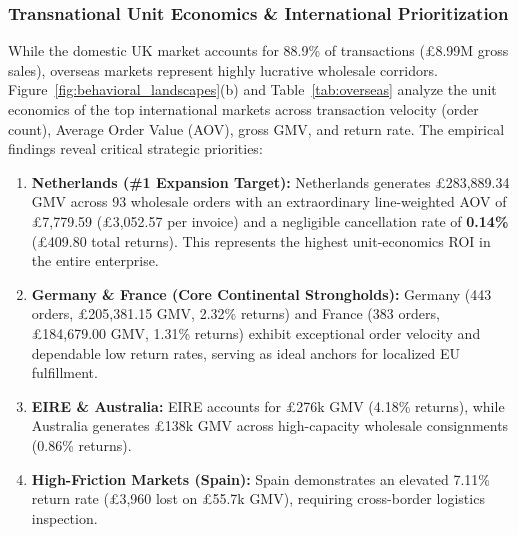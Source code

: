 \documentclass[sigconf,nonacm]{acmart}
\begin{document}
\subsubsection{Transnational Unit Economics \& International Prioritization}
While the domestic UK market accounts for 88.9\% of transactions (£8.99M gross sales), overseas markets represent highly lucrative wholesale corridors. Figure~\ref{fig:behavioral_landscapes}(b) and Table~\ref{tab:overseas} analyze the unit economics of the top international markets across transaction velocity (order count), Average Order Value (AOV), gross GMV, and return rate. The empirical findings reveal critical strategic priorities:
\begin{enumerate}
    \item \textbf{Netherlands (\#1 Expansion Target):} Netherlands generates £283,889.34 GMV across 93 wholesale orders with an extraordinary line-weighted AOV of £7,779.59 (£3,052.57 per invoice) and a negligible cancellation rate of \textbf{0.14\%} (£409.80 total returns). This represents the highest unit-economics ROI in the entire enterprise.
    \item \textbf{Germany \& France (Core Continental Strongholds):} Germany (443 orders, £205,381.15 GMV, 2.32\% returns) and France (383 orders, £184,679.00 GMV, 1.31\% returns) exhibit exceptional order velocity and dependable low return rates, serving as ideal anchors for localized EU fulfillment.
    \item \textbf{EIRE \& Australia:} EIRE accounts for £276k GMV (4.18\% returns), while Australia generates £138k GMV across high-capacity wholesale consignments (0.86\% returns).
    \item \textbf{High-Friction Markets (Spain):} Spain demonstrates an elevated 7.11\% return rate (£3,960 lost on £55.7k GMV), requiring cross-border logistics inspection.
\end{enumerate}
\end{document}
